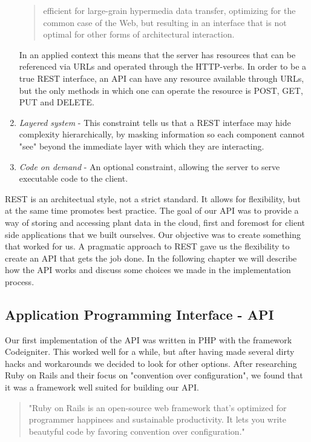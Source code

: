 \begin{enumerate}
\begin{quote} efficient for large-grain hypermedia data transfer, optimizing for the common case of the Web, but resulting in an interface that is not optimal for other forms of architectural interaction. \citep{fielding2000architectural} 
\end{quote}

In an applied context this means that the server has resources that can be referenced via URLs and operated through the HTTP-verbs. In order to be a true REST interface, an API can have any resource available through URLs, but the only methods in which one can operate the resource is POST, GET, PUT and DELETE.

\item{} \emph{Layered system} - This constraint tells us that a REST interface may hide complexity hierarchically, by masking information so each component cannot "see" beyond the immediate layer with which they are interacting. \citep{fielding2000architectural}

\item{} \emph{Code on demand} - An optional constraint, allowing the server to serve executable code to the client. 

\end{enumerate}

REST is an architectual style, not a strict standard. It allows for flexibility, but at the same time promotes best practice. The goal of our API was to provide a way of storing and accessing plant data in the cloud, first and foremost for client side applications that we built ourselves. Our objective was to create something that worked for us. A pragmatic approach to REST gave us the flexibility to create an API that gets the job done. In the following chapter we will describe how the API works and discuss some choices we made in the implementation process.

\subsection{Application Programming Interface - API}
Our first implementation of the API was written in PHP with the framework Codeigniter. This worked well for a while, but after having made several dirty hacks and workarounds we decided to look for other options. After researching Ruby on Rails and their focus on "convention over configuration", we found that it was a framework well suited for building our API.  

\begin{quote}
"Ruby on Rails is an open-source web framework that’s optimized for programmer happinees and sustainable productivity. It lets you write beautyful code by favoring convention over configuration."\citep{rubyonrails.org} 
\end{quote}

